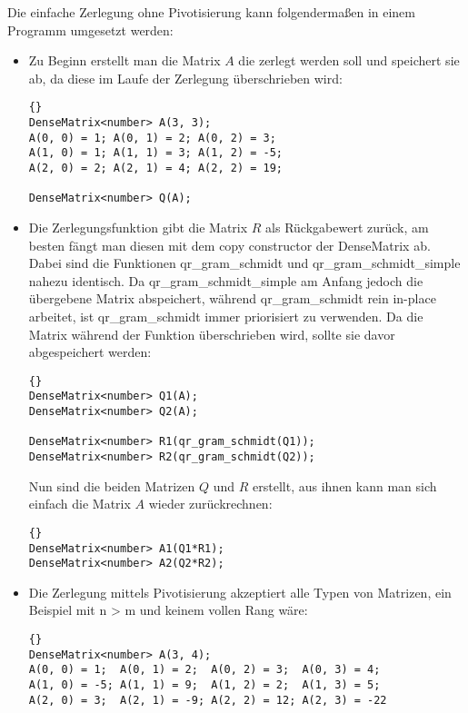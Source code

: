 \documentclass[a4paper,11pt]{article}
\theoremstyle{definition}
\begin{document}
Die einfache Zerlegung ohne Pivotisierung kann folgendermaßen in einem Programm
umgesetzt werden:
\begin{itemize}
\item Zu Beginn erstellt man die Matrix $A$ die zerlegt werden soll und speichert sie
ab, da diese im Laufe der Zerlegung überschrieben wird:

    {\footnotesize{\begin{lstlisting}{}
DenseMatrix<number> A(3, 3);
A(0, 0) = 1; A(0, 1) = 2; A(0, 2) = 3;
A(1, 0) = 1; A(1, 1) = 3; A(1, 2) = -5;
A(2, 0) = 2; A(2, 1) = 4; A(2, 2) = 19;

DenseMatrix<number> Q(A);
\end{lstlisting}}}

\item Die Zerlegungsfunktion gibt die Matrix $R$ als Rückgabewert zurück, am besten
fängt man diesen mit dem copy constructor der DenseMatrix ab. Dabei sind die
Funktionen qr\_gram\_schmidt und qr\_gram\_schmidt\_simple nahezu identisch. Da
qr\_gram\_schmidt\_simple am Anfang jedoch die übergebene Matrix abspeichert, während
qr\_gram\_schmidt rein in-place arbeitet, ist qr\_gram\_schmidt immer priorisiert zu
verwenden. Da die Matrix während der Funktion überschrieben wird, sollte sie davor
abgespeichert werden:

    {\footnotesize{\begin{lstlisting}{}
DenseMatrix<number> Q1(A);
DenseMatrix<number> Q2(A);
    
DenseMatrix<number> R1(qr_gram_schmidt(Q1));
DenseMatrix<number> R2(qr_gram_schmidt(Q2));
\end{lstlisting}}}

Nun sind die beiden Matrizen $Q$ und $R$ erstellt, aus ihnen kann man sich einfach
die Matrix $A$ wieder zurückrechnen:

    {\footnotesize{\begin{lstlisting}{}
DenseMatrix<number> A1(Q1*R1);
DenseMatrix<number> A2(Q2*R2);
\end{lstlisting}}}

\item Die Zerlegung mittels Pivotisierung akzeptiert alle Typen von Matrizen, ein
Beispiel mit n > m und keinem vollen Rang wäre:

    {\footnotesize{\begin{lstlisting}{}
DenseMatrix<number> A(3, 4);
A(0, 0) = 1;  A(0, 1) = 2;  A(0, 2) = 3;  A(0, 3) = 4;
A(1, 0) = -5; A(1, 1) = 9;  A(1, 2) = 2;  A(1, 3) = 5;
A(2, 0) = 3;  A(2, 1) = -9; A(2, 2) = 12; A(2, 3) = -22
\end{lstlisting}}}


\end{itemize}
\end{document}
